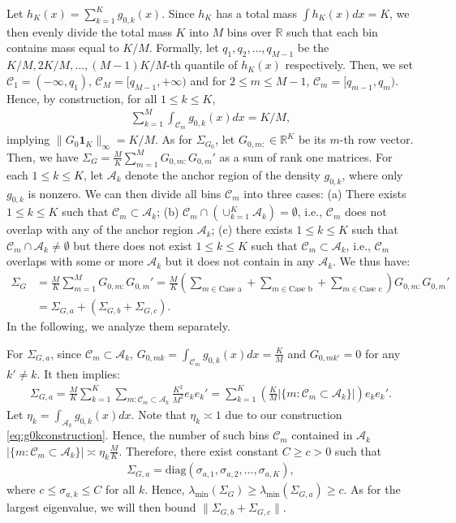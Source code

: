 \documentclass[preprint,11pt]{article}
\newcommand{\mbb}{\mathbb}
\newcommand{\mbf}{\mathbf}
\newcommand{\mcal}{\mathcal}
\numberwithin{equation}{section}
\newcommand{\diag}{\mathrm{diag}}
\begin{document}
Let $h_K(x)=\sum_{k=1}^Kg_{0,k}(x)$. Since $h_K$ has a total mass $\int h_K(x)dx=K$, we then evenly divide the total mass $K$ into $M$ bins over $\mbb{R}$ such that each bin contains mass equal to $K/M$. Formally, let $q_1,q_2,\ldots,q_{M-1}$ be the $K/M, 2K/M,\ldots,(M-1)K/M$-th quantile of $h_K(x)$ respectively. Then, we set $\mcal{C}_1 = (-\infty,q_1)$, $\mcal{C}_M=[q_{M-1},+\infty)$ and for $2\le m\le M-1$, $\mcal{C}_m = [q_{m-1},q_m)$. Hence, by construction, for all $1\le k\le K$,
\begin{align*}
    \sum_{k=1}^M\int_{\mcal{C}_m}g_{0,k}(x)dx = K/M,
\end{align*}
implying $\|G_{0}\mbf{1}_{K}\|_{\infty}=K/M$. As for $\Sigma_{G_0}$, let $G_{0,m:}\in\mbb{R}^K$ be its $m$-th row vector. Then, we have $\Sigma_G = \frac{M}{K}\sum_{m=1}^MG_{0,m:}G_{0,m}'$ as a sum of rank one matrices. For each $1\le k\le K$, let $\mcal{A}_k$ denote the anchor region of the density $g_{0,k}$, where only $g_{0,k}$ is nonzero. We can then divide all bins $\mcal{C}_m$ into three cases: (a) There exists $1\le k\le K$ such that $\mcal{C}_m\subset \mcal{A}_k$; (b) $\mcal{C}_m\cap\left(\cup_{k=1}^K\mcal{A}_k\right)=\emptyset$, i.e., $\mcal{C}_m$ does not overlap with any of the anchor region $\mcal{A}_k$; (c) there exists $1\le k\le K$ such that $\mcal{C}_m\cap\mcal{A}_k\neq \emptyset$ but there does not exist $1\le k\le K$ such that $\mcal{C}_m\subset\mcal{A}_k$, i.e., $\mcal{C}_m$ overlaps with some or more $\mcal{A}_k$ but it does not contain in any $\mcal{A}_k$. We thus have:
\begin{align*}
    \Sigma_G &= \frac{M}{K}\sum_{m=1}^MG_{0,m:}G_{0,m}'=\frac{M}{K}\left(\sum_{m\in\text{Case\ a}}+\sum_{m\in\text{Case\ b}}+\sum_{m\in\text{Case\ c}}\right)G_{0,m:}G_{0,m}'\\
    &=\Sigma_{G,a}+\left(\Sigma_{G,b}+\Sigma_{G,c}\right).
\end{align*}
In the following, we analyze them separately.

For $\Sigma_{G,a}$, since $\mcal{C}_m\subset \mcal{A}_k$, $G_{0,mk}=\int_{\mcal{C}_m}g_{0,k}(x)dx= \frac{K}{M}$ and $G_{0,mk'}=0$ for any $k'\neq k$. It then implies:
\begin{align*}
    \Sigma_{G,a}=\frac{M}{K}\sum_{k=1}^K\sum_{m:\mcal{C}_m\subset\mcal{A}_k}\frac{K^2}{M^2}e_ke_k'=\sum_{k=1}^K\left(\frac{K}{M}|\{m:\mcal{C}_m\subset\mcal{A}_k\}|\right)e_ke_k'.
\end{align*}
Let $\eta_k = \int_{\mcal{A}_k}g_{0,k}(x)dx$. Note that $\eta_k\asymp1$ due to our construction \eqref{eq:g0kconstruction}. Hence, the number of such bins $\mcal{C}_m$ contained in $\mcal{A}_k$ $|\{m:\mcal{C}_m\subset\mcal{A}_k\}|\asymp \eta_k\frac{M}{K}$. Therefore, there exist constant $C\ge c>0$ such that
\begin{align*}
     \Sigma_{G,a}=\diag(\sigma_{a,1},\sigma_{a,2},\ldots,\sigma_{a,K}),
\end{align*}
where $c\le \sigma_{a,k}\le C$ for all $k$. Hence, $\lambda_{\min}(\Sigma_G)\ge \lambda_{\min}(\Sigma_{G,a})\ge c$. As for the largest eigenvalue, we will then bound $\|\Sigma_{G,b}+\Sigma_{G,c}\|$.
\end{document}
